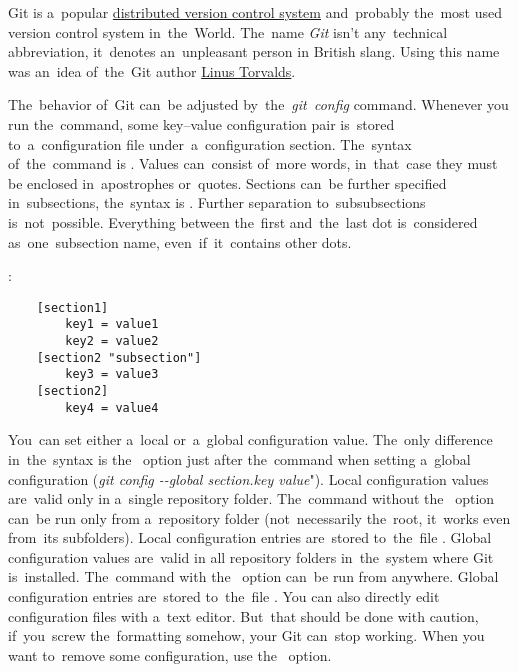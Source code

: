 \label{git}
Git is a~popular \hyperref[distributedversioncontrolsystem]{distributed version control system} and~probably the~most used version control system in~the~World.
The~name \textit{Git} isn't any~technical abbreviation, it~denotes an~unpleasant person in British slang.
Using this name was an~idea of~the~Git author \href{https://en.wikipedia.org/wiki/Linus_Torvalds}{Linus Torvalds}.

\label{gitconfig}
The~behavior of~Git can~be adjusted by~the~\textit{git~config} command.
Whenever you run the~command, some key--value configuration pair is~stored to~a~configuration file under~a~configuration section.
The~syntax of~the~command is .
Values can~consist of~more words, in~that~case they must be enclosed in~apostrophes or~quotes.
Sections can~be further specified in~subsections, the~syntax is .
Further separation to~subsubsections is~not~possible.
Everything between the~first and~the~last dot is~considered as~one~subsection name, even~if~it~contains other dots.

:
\begin{lstlisting}
    [section1]
        key1 = value1
        key2 = value2
    [section2 "subsection"]
        key3 = value3
    [section2]
        key4 = value4
\end{lstlisting}
\newline

\enlargethispage{-8mm}
\noindent You~can set either a~local or~a~global configuration value.
The~only difference in~the~syntax is the~ option just after the~command when setting a~global configuration (\textit{git config \mbox{-{}-global} section.key value}").
Local configuration values are~valid only in a~single repository folder.
The~command without the~ option can~be run only from a~repository folder (not~necessarily the~root, it~works even from~its subfolders).
Local configuration entries are~stored to~the~file .
Global configuration values are~valid in all repository folders in~the~system where Git is~installed.
The~command with the~ option can~be run from anywhere.
Global configuration entries are~stored to~the~file .
You can also directly edit configuration files with a~text editor.
But~that should be done with caution, if~you~screw the~formatting somehow, your Git can~stop working.
When you want to~remove some configuration, use the~ option.

